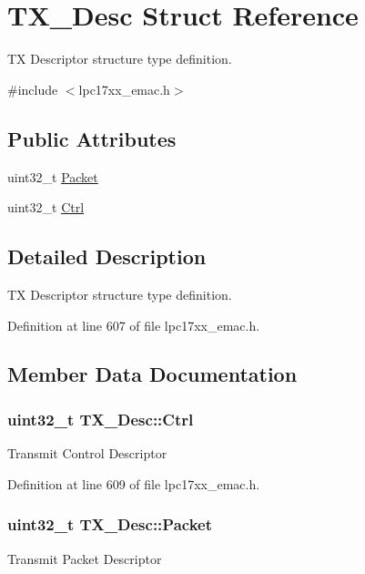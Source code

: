 \hypertarget{struct_t_x___desc}{\section{\-T\-X\-\_\-\-Desc \-Struct \-Reference}
\label{struct_t_x___desc}
}


\-T\-X \-Descriptor structure type definition.  




{\ttfamily \#include $<$lpc17xx\-\_\-emac.\-h$>$}

\subsection*{\-Public \-Attributes}
\begin{DoxyCompactItemize}
\item 
uint32\-\_\-t \hyperlink{struct_t_x___desc_a8a43910f1215d2afa7d155917364d97f}{\-Packet}
\item 
uint32\-\_\-t \hyperlink{struct_t_x___desc_ac8d46707e08991e37d34f48806b3abde}{\-Ctrl}
\end{DoxyCompactItemize}


\subsection{\-Detailed \-Description}
\-T\-X \-Descriptor structure type definition. 

\-Definition at line 607 of file lpc17xx\-\_\-emac.\-h.



\subsection{\-Member \-Data \-Documentation}
\hypertarget{struct_t_x___desc_ac8d46707e08991e37d34f48806b3abde}{
\subsubsection[{\-Ctrl}]{\setlength{\rightskip}{0pt plus 5cm}uint32\-\_\-t {\bf \-T\-X\-\_\-\-Desc\-::\-Ctrl}}}\label{struct_t_x___desc_ac8d46707e08991e37d34f48806b3abde}
\-Transmit \-Control \-Descriptor 

\-Definition at line 609 of file lpc17xx\-\_\-emac.\-h.

\hypertarget{struct_t_x___desc_a8a43910f1215d2afa7d155917364d97f}{
\subsubsection[{\-Packet}]{\setlength{\rightskip}{0pt plus 5cm}uint32\-\_\-t {\bf \-T\-X\-\_\-\-Desc\-::\-Packet}}}\label{struct_t_x___desc_a8a43910f1215d2afa7d155917364d97f}
\-Transmit \-Packet \-Descriptor 

